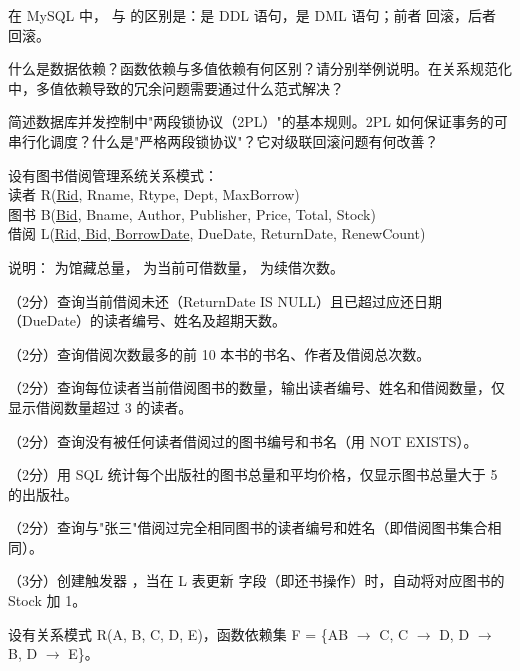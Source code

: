 \documentclass[a4paper,11pt]{article}
\begin{document}
\q 在 MySQL 中， 与  的区别是：\fillblank 是 DDL 语句，\fillblank 是 DML 语句；前者 \fillblank 回滚，后者 \fillblank 回滚。


\q 什么是数据依赖？函数依赖与多值依赖有何区别？请分别举例说明。在关系规范化中，多值依赖导致的冗余问题需要通过什么范式解决？
\anslines{3cm}

\q 简述数据库并发控制中"两段锁协议（2PL）"的基本规则。2PL 如何保证事务的可串行化调度？什么是"严格两段锁协议"？它对级联回滚问题有何改善？
\anslines{3cm}


设有图书借阅管理系统关系模式：\\
读者 R(\underline{Rid}, Rname, Rtype, Dept, MaxBorrow)\\
图书 B(\underline{Bid}, Bname, Author, Publisher, Price, Total, Stock)\\
借阅 L(\underline{Rid, Bid, BorrowDate}, DueDate, ReturnDate, RenewCount)

说明： 为馆藏总量， 为当前可借数量， 为续借次数。

\q （2分）查询当前借阅未还（ReturnDate IS NULL）且已超过应还日期（DueDate）的读者编号、姓名及超期天数。
\anslines{1cm}

\q （2分）查询借阅次数最多的前 10 本书的书名、作者及借阅总次数。
\anslines{1cm}

\q （2分）查询每位读者当前借阅图书的数量，输出读者编号、姓名和借阅数量，仅显示借阅数量超过 3 的读者。
\anslines{1cm}

\q （2分）查询没有被任何读者借阅过的图书编号和书名（用 NOT EXISTS）。
\anslines{1cm}

\q （2分）用 SQL 统计每个出版社的图书总量和平均价格，仅显示图书总量大于 5 的出版社。
\anslines{1cm}

\q （2分）查询与"张三"借阅过完全相同图书的读者编号和姓名（即借阅图书集合相同）。
\anslines{1.2cm}

\q （3分）创建触发器 ，当在 L 表更新  字段（即还书操作）时，自动将对应图书的 Stock 加 1。
\anslines{1.5cm}


\q 设有关系模式 R(A, B, C, D, E)，函数依赖集 F = \{AB $\rightarrow$ C, C $\rightarrow$ D, D $\rightarrow$ B, D $\rightarrow$ E\}。
\end{document}

